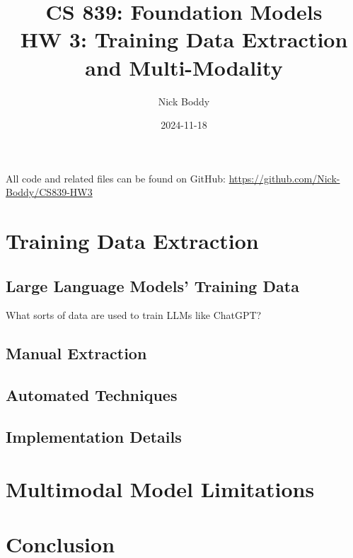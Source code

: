 \documentclass{article}
\title{CS 839: Foundation Models \\ HW 3: Training Data Extraction and Multi-Modality}
\author{Nick Boddy}
\date{2024-11-18}
\begin{document}
	
	\maketitle
	
	All code and related files can be found on GitHub:
	\url{https://github.com/Nick-Boddy/CS839-HW3}
	
	\section{Training Data Extraction}
	
	\subsection{Large Language Models' Training Data}
	What sorts of data are used to train LLMs like ChatGPT?
	
	\subsection{Manual Extraction}
	
	\subsection{Automated Techniques}
	
	\subsection{Implementation Details}
	
	
	\section{Multimodal Model Limitations}
	
	
	\section{Conclusion}
	
	
\end{document}
